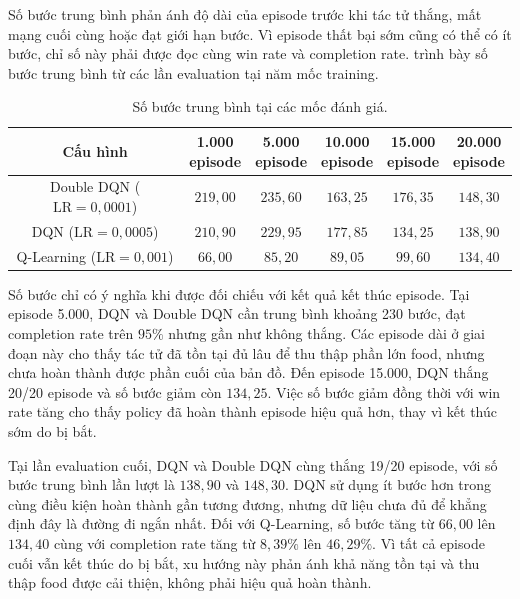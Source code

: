 Số bước trung bình phản ánh độ dài của episode trước khi tác tử thắng, mất mạng cuối cùng hoặc đạt giới hạn bước. Vì episode thất bại sớm cũng có thể có ít bước, chỉ số này phải được đọc cùng win rate và completion rate.  trình bày số bước trung bình từ các lần evaluation tại năm mốc training.

\begin{table}[H]
    \centering
    \renewcommand{\arraystretch}{1.2}
    \small
    \begin{tabular}{cccccc}
        \toprule
        \textbf{Cấu hình} & \makecell{\textbf{1.000}\\\textbf{episode}} & \makecell{\textbf{5.000}\\\textbf{episode}} & \makecell{\textbf{10.000}\\\textbf{episode}} & \makecell{\textbf{15.000}\\\textbf{episode}} & \makecell{\textbf{20.000}\\\textbf{episode}} \\
        \midrule
        Double DQN ($\mathrm{LR}=0{,}0001$) & $219{,}00$ & $235{,}60$ & $163{,}25$ & $176{,}35$ & $148{,}30$ \\
        DQN ($\mathrm{LR}=0{,}0005$) & $210{,}90$ & $229{,}95$ & $177{,}85$ & $134{,}25$ & $138{,}90$ \\
        Q-Learning ($\mathrm{LR}=0{,}001$) & $66{,}00$ & $85{,}20$ & $89{,}05$ & $99{,}60$ & $134{,}40$ \\
        \bottomrule
    \end{tabular}
    \caption{Số bước trung bình tại các mốc đánh giá.}
    \label{tab:steps-progress}
\end{table}

Số bước chỉ có ý nghĩa khi được đối chiếu với kết quả kết thúc episode. Tại episode 5.000, DQN và Double DQN cần trung bình khoảng 230 bước, đạt completion rate trên $95\%$ nhưng gần như không thắng. Các episode dài ở giai đoạn này cho thấy tác tử đã tồn tại đủ lâu để thu thập phần lớn food, nhưng chưa hoàn thành được phần cuối của bản đồ. Đến episode 15.000, DQN thắng 20/20 episode và số bước giảm còn $134{,}25$. Việc số bước giảm đồng thời với win rate tăng cho thấy policy đã hoàn thành episode hiệu quả hơn, thay vì kết thúc sớm do bị bắt.

Tại lần evaluation cuối, DQN và Double DQN cùng thắng 19/20 episode, với số bước trung bình lần lượt là $138{,}90$ và $148{,}30$. DQN sử dụng ít bước hơn trong cùng điều kiện hoàn thành gần tương đương, nhưng dữ liệu chưa đủ để khẳng định đây là đường đi ngắn nhất. Đối với Q-Learning, số bước tăng từ $66{,}00$ lên $134{,}40$ cùng với completion rate tăng từ $8{,}39\%$ lên $46{,}29\%$. Vì tất cả episode cuối vẫn kết thúc do bị bắt, xu hướng này phản ánh khả năng tồn tại và thu thập food được cải thiện, không phải hiệu quả hoàn thành.

